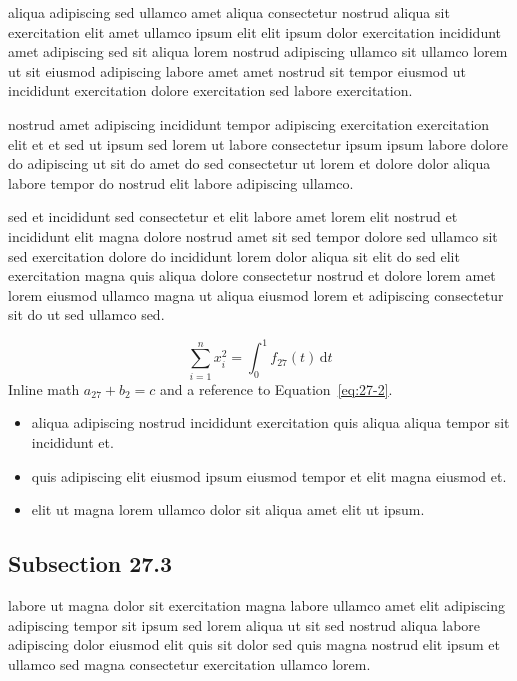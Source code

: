 \documentclass{article}
\begin{document}
aliqua adipiscing sed ullamco amet aliqua consectetur nostrud aliqua sit exercitation elit amet ullamco ipsum elit elit ipsum dolor exercitation incididunt amet adipiscing sed sit aliqua lorem nostrud adipiscing ullamco sit ullamco lorem ut sit eiusmod adipiscing labore amet amet nostrud sit tempor eiusmod ut incididunt exercitation dolore exercitation sed labore exercitation.

nostrud amet adipiscing incididunt tempor adipiscing exercitation exercitation elit et et sed ut ipsum sed lorem ut labore consectetur ipsum ipsum labore dolore do adipiscing ut sit do amet do sed consectetur ut lorem et dolore dolor aliqua labore tempor do nostrud elit labore adipiscing ullamco.

sed et incididunt sed consectetur et elit labore amet lorem elit nostrud et incididunt elit magna dolore nostrud amet sit sed tempor dolore sed ullamco sit sed exercitation dolore do incididunt lorem dolor aliqua sit elit do sed elit exercitation magna quis aliqua dolore consectetur nostrud et dolore lorem amet lorem eiusmod ullamco magna ut aliqua eiusmod lorem et adipiscing consectetur sit do ut sed ullamco sed.

\begin{equation}\label{eq:27-2}
  \sum_{i=1}^{n} x_i^{2} = \int_0^1 f_{27}(t)\,\mathrm{d}t
\end{equation}
Inline math $a_{27} + b_{2} = c$ and a reference to Equation~\eqref{eq:27-2}.

\begin{itemize}
  \item aliqua adipiscing nostrud incididunt exercitation quis aliqua aliqua tempor sit incididunt et.
  \item quis adipiscing elit eiusmod ipsum eiusmod tempor et elit magna eiusmod et.
  \item elit ut magna lorem ullamco dolor sit aliqua amet elit ut ipsum.
\end{itemize}

\subsection{Subsection 27.3}\label{sec:27-3}
labore ut magna dolor sit exercitation magna labore ullamco amet elit adipiscing adipiscing tempor sit ipsum sed lorem aliqua ut sit sed nostrud aliqua labore adipiscing dolor eiusmod elit quis sit dolor sed quis magna nostrud elit ipsum et ullamco sed magna consectetur exercitation ullamco lorem.
\end{document}
